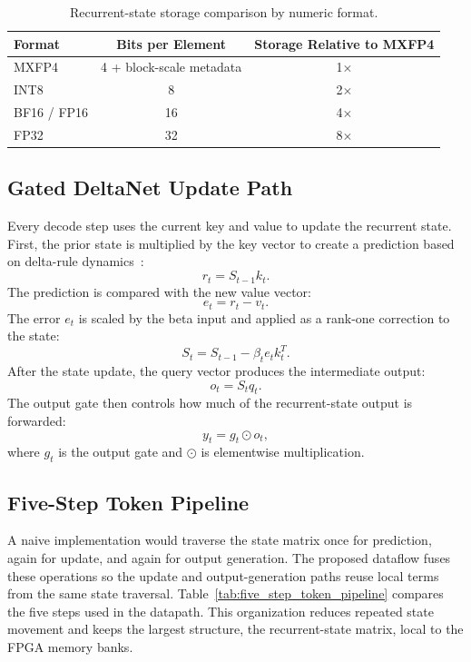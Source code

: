 \documentclass[conference]{IEEEtran}
\begin{document}
\begin{table}[t]
\centering
\caption{Recurrent-state storage comparison by numeric format.}
\label{tab:memory_footprint}
\footnotesize
\begin{tabularx}{\linewidth}{Xcc}
\toprule
Format & Bits per Element & Storage Relative to MXFP4 \\
\midrule
MXFP4 & 4 + block-scale metadata & 1$\times$ \\
INT8 & 8 & 2$\times$ \\
BF16 / FP16 & 16 & 4$\times$ \\
FP32 & 32 & 8$\times$ \\
\bottomrule
\end{tabularx}
\end{table}

\subsection{Gated DeltaNet Update Path}
Every decode step uses the current key and value to update the recurrent state. First, the prior state is multiplied by the key vector to create a prediction based on delta-rule dynamics~\cite{b4}:
\begin{equation}
r_t = S_{t-1} k_t .
\end{equation}
The prediction is compared with the new value vector:
\begin{equation}
e_t = r_t - v_t .
\end{equation}
The error $e_t$ is scaled by the beta input and applied as a rank-one correction to the state:
\begin{equation}
S_t = S_{t-1} - \beta_t e_t k_t^T .
\end{equation}
After the state update, the query vector produces the intermediate output:
\begin{equation}
o_t = S_t q_t .
\end{equation}
The output gate then controls how much of the recurrent-state output is forwarded:
\begin{equation}
y_t = g_t \odot o_t ,
\end{equation}
where $g_t$ is the output gate and $\odot$ is elementwise multiplication.

\subsection{Five-Step Token Pipeline}
A naive implementation would traverse the state matrix once for prediction, again for update, and again for output generation. The proposed dataflow fuses these operations so the update and output-generation paths reuse local terms from the same state traversal. Table~\ref{tab:five_step_token_pipeline} compares the five steps used in the datapath. This organization reduces repeated state movement and keeps the largest structure, the recurrent-state matrix, local to the FPGA memory banks.
\end{document}
